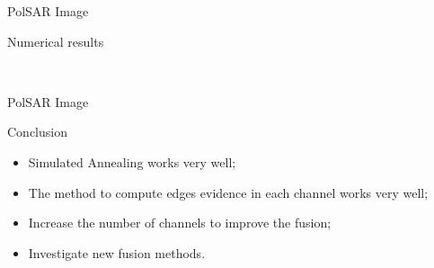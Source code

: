 \documentclass[10pt]{beamer}
\begin{document}
\begin{frame}[fragile]{PolSAR Image}
\begin{alertblock}{Numerical results}
	\begin{figure}[hbt]
	\centering
     \quad
     \\
     \quad
     \label{evidencias_hh_hv_vv}
   \end{figure}	
\end{alertblock}
\end{frame}

\begin{frame}[fragile]{PolSAR Image}
\begin{alertblock}{Conclusion}
\begin{itemize}
	\item Simulated Annealing works very well;
	\item The method to compute edges evidence in each channel works very well;
	\item Increase the number of channels to improve the fusion;
	\item Investigate new fusion methods.
\end{itemize}
\end{alertblock}
\end{frame}

\begin{frame}[allowframebreaks]


\end{frame}
\end{document}
